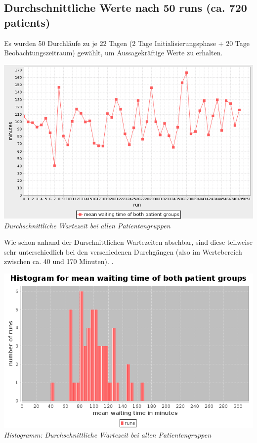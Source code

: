 \documentclass{article}
\begin{document}
\subsection{Durchschnittliche Werte nach 50 runs (ca. 720 patients)}
Es wurden 50 Durchläufe zu je 22 Tagen (2 Tage Initialisierungsphase + 20 Tage Beobachtungszeitraum) gewählt, um Aussagekräftige Werte zu erhalten.\\
\begin{center}
\includegraphics[scale=0.35]{img/avg_waiting.png}\\
\textit{Durchschnittliche Wartezeit bei allen Patientengruppen}\\
\end{center}
Wie schon anhand der Durschnittlichen Wartezeiten absehbar, sind diese teilweise sehr unterschiedlich bei den verschiedenen Durchgängen (also im Wertebereich zwischen ca. 40 und 170 Minuten).
.\\
\begin{center}
\includegraphics[scale=0.4]{img/avg_wait_histogram.png}\\
\textit{Histogramm: Durchschnittliche Wartezeit bei allen Patientengruppen}\\
\end{center}
\end{document}
